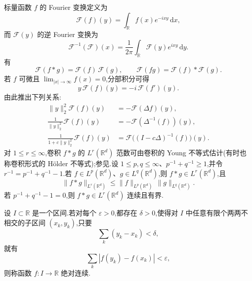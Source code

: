 \begin{note}\label{note:appendix-a-47}
标量函数 $f$ 的 Fourier 变换定义为
\begin{equation}\label{eq:appendix-a-23}
 \mathcal F(f)(y)=\int_{\mathbb R}f(x)e^{-i xy}\,\mathrm dx,
\end{equation}
而 $\mathcal F(y)$ 的逆 Fourier 变换为
\begin{equation}\label{eq:appendix-a-24}
 \mathcal F^{-1}(\mathcal F)(x)=\frac{1}{2\pi}
 \int_{\mathbb R}\mathcal F(y)e^{i xy}\,\mathrm dy.
\end{equation}
有
\begin{equation}\label{eq:appendix-a-25}
 \mathcal F(f*g)=\mathcal F(f)\,\mathcal F(g),
 \qquad \mathcal F(fg)=\mathcal F(f)*\mathcal F(g).
\end{equation}
若 $f$ 可微且 $\lim_{|x|\to\infty}f(x)=0$,分部积分可得
\[
 y\,\mathcal F(f)(y)=-i\,\mathcal F(f')(y).
\]
由此推出下列关系:
\begin{align}
 \|y\|_2^2\mathcal F(f)(y)&=-\mathcal F(\Delta f)(y),\label{eq:appendix-a-26}\\
 \frac{1}{\|y\|_2^2}\mathcal F(f)(y)&=-\mathcal F(\Delta^{-1}(f))(y),\label{eq:appendix-a-27}\\
 \frac{1}{1+c\|y\|_2^2}\mathcal F(f)(y)&=\mathcal F\bigl((I-c\Delta)^{-1}(f)\bigr)(y).\label{eq:appendix-a-28}
\end{align}
对 $1\le r\le\infty$,卷积 $f*g$ 的 $L^r(\mathbb R^d)$ 范数可由卷积的 Young 不等式估计(有时也称卷积形式的 Hölder 不等式);参见\textcite[第 IV.4.5 节]{Hormander1990}.设 $1\le p,q\le\infty$、$p^{-1}+q^{-1}\ge1$,并令 $r^{-1}=p^{-1}+q^{-1}-1$.若 $f\in L^p(\mathbb R^d)$、$g\in L^q(\mathbb R^d)$,则 $f*g\in L^r(\mathbb R^d)$,且
\begin{equation}\label{eq:appendix-a-29}
 \|f*g\|_{L^r(\mathbb R^d)}\le\|f\|_{L^p(\mathbb R^d)}\,\|g\|_{L^q(\mathbb R^d)}.
\end{equation}
若 $p^{-1}+q^{-1}-1=0$,则 $f*g\in L^r(\mathbb R^d)$ 连续且有界.
\end{note}

\begin{definition}[绝对连续函数]\label{def:appendix-a-48}
设 $I\subset\mathbb R$ 是一个区间.若对每个 $\varepsilon>0$,都存在 $\delta>0$,使得对 $I$ 中任意有限个两两不相交的子区间 $(x_k,y_k)$,只要
\[
 \sum_k(y_k-x_k)<\delta,
\]
就有
\[
 \sum_k|f(y_k)-f(x_k)|<\varepsilon,
\]
则称函数 $f:I\to\mathbb R$ 绝对连续.
\end{definition}

